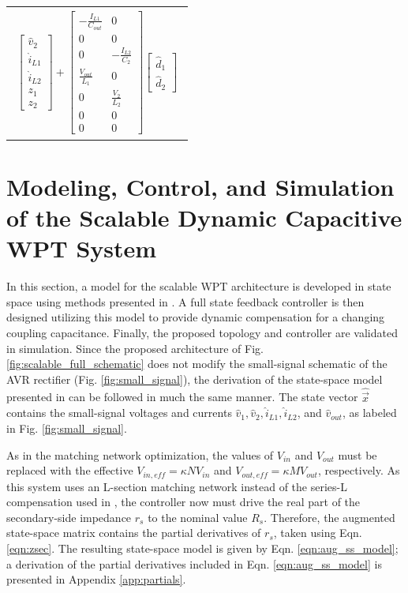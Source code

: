 \documentclass[conference, twocolumn, letterpaper]{IEEEtran}
\begin{document}
\begin{table}[t]
\begin{tabular}{p{\linewidth}}
{\begin{align}
\begin{bmatrix}
			\hat{v}_2 \\
			\hat{i}_{L1} \\
			\hat{i}_{L2} \\
			z_1 \\
			z_2
		\end{bmatrix}
		+
		\begin{bmatrix}
			-\frac{I_{L1}}{C_{out}} & 0 \\
			0 & 0 \\
			0 & -\frac{I_{L2}}{C_2} \\
			\frac{V_{out}}{L_1} & 0 \\
			0 & \frac{V_2}{L_2} \\
			0 & 0 \\
			0 & 0
		\end{bmatrix}
		\begin{bmatrix}
			\hat{d}_1 \\
			\hat{d}_2
		\end{bmatrix}
	\end{align}
}
\end{tabular}
\vspace{-0.5cm}
\end{table}

\section{Modeling, Control, and Simulation of the Scalable Dynamic Capacitive WPT System}
\label{sec:mod_ctrl_sim}

In this section, a model for the scalable WPT architecture is developed in state space using methods presented in \cite{2025_Liao_COMPEL, 2010_Mayo_CONIELECOMP}. A full state feedback controller is then designed utilizing this model to provide dynamic compensation for a changing coupling capacitance. Finally, the proposed topology and controller are validated in simulation. Since the proposed architecture of Fig. \ref{fig:scalable_full_schematic} does not modify the small-signal schematic of the AVR rectifier (Fig. \ref{fig:small_signal}), the derivation of the state-space model presented in \cite{2025_Liao_COMPEL} can be followed in much the same manner. The state vector $\hat{\vec{x}}$ contains the small-signal voltages and currents $\hat{v}_1, \hat{v}_2, \hat{i}_{L1}, \hat{i}_{L2}$, and $\hat{v}_{out}$, as labeled in Fig. \ref{fig:small_signal}.

As in the matching network optimization, the values of $V_{in}$ and $V_{out}$ must be replaced with the effective $V_{in,eff} = \kappa N V_{in}$ and $V_{out,eff} = \kappa M V_{out}$, respectively. As this system uses an L-section matching network instead of the series-L compensation used in \cite{2025_Liao_COMPEL}, the controller now must drive the real part of the secondary-side impedance $r_s$ to the nominal value $R_s$. Therefore, the augmented state-space matrix contains the partial derivatives of $r_s$, taken using Eqn. \ref{eqn:zsec}. The resulting state-space model is given by Eqn. \ref{eqn:aug_ss_model}; a derivation of the partial derivatives included in Eqn. \ref{eqn:aug_ss_model} is presented in Appendix \ref{app:partials}. 
\end{document}
